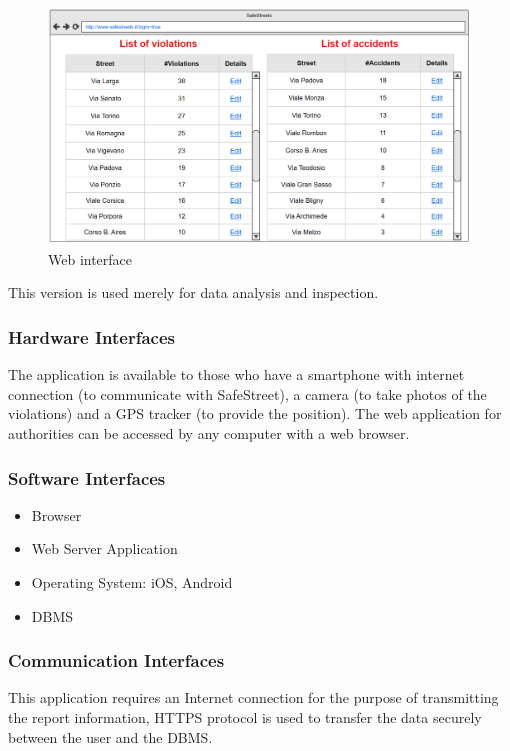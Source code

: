 \begin{figure} [H]
    \includegraphics[scale=0.5255]{Images/Templates/Authority/auth_4.PNG}
    \caption{\label{fig:Mockup-8}Web interface}
\end{figure}

This version is used merely for data analysis and inspection.

\subsubsection{Hardware Interfaces}

The application is available to those who have a smartphone with internet 
connection (to communicate with SafeStreet), a camera (to take photos of 
the violations) and a GPS tracker (to provide the position).
The web application for authorities can be accessed by any computer with 
a web browser.

\subsubsection{Software Interfaces}

\begin{itemize}
    \item Browser
    \item Web Server Application
    \item Operating System: iOS, Android
    \item DBMS
\end{itemize} 

\subsubsection{Communication Interfaces}

This application requires an Internet connection for the purpose of 
transmitting the report information, HTTPS protocol is used to transfer 
the data securely between the user and the DBMS.

